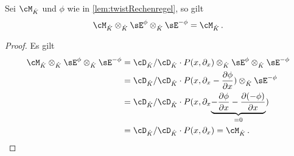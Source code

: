 \begin{cor} \label{cor:zuruecktwisten}
Sei $\cM_{\hat K}$ und $\phi$ wie in \ref{lem:twistRechenregel}, so gilt
\[
\cM_{\hat K}\otimes_{\hat K}\sE^{\phi}\otimes_{\hat K}\sE^{-\phi}=\cM_{\hat K}\,.
\]
\end{cor}
\begin{proof}
Es gilt
\begin{align*}
\cM_{\hat K}\otimes_{\hat K}\sE^{\phi}\otimes_{\hat K}\sE^{-\phi}
  &= \cD_{\hat K}/\cD_{\hat K}\cdot P(x,\partial_x)
    \otimes_{\hat K}\sE^{\phi}\otimes_{\hat K}\sE^{-\phi}
\\&= \cD_{\hat K}/\cD_{\hat K}
  \cdot P(x,\partial_x-\frac{\partial \phi}{\partial x})
  \otimes_{\hat K}\sE^{-\phi}
\\&= \cD_{\hat K}/\cD_{\hat K} \cdot P(x,\partial_x\underset{=0}{\underbrace{
  -\frac{\partial \phi}{\partial x} -\frac{\partial (-\phi)}{\partial x}}})
\\&= \cD_{\hat K}/\cD_{\hat K} \cdot P(x,\partial_x) = \cM_{\hat K} \,.
\end{align*}
\end{proof}

